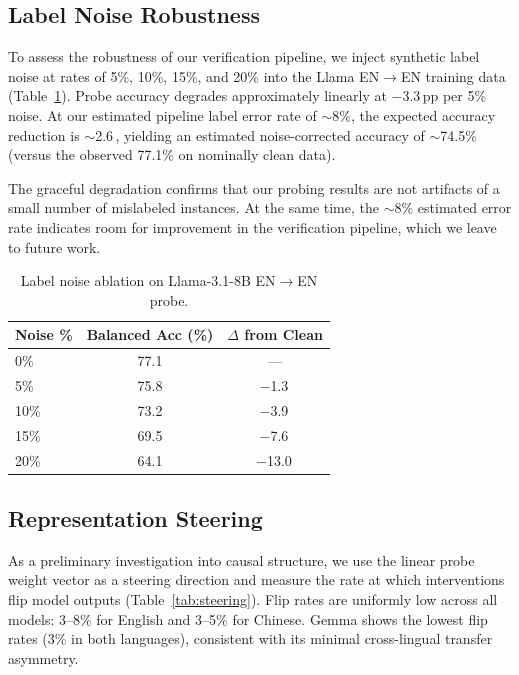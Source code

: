 \documentclass[11pt]{article}
\newcommand{\pp}{\,\text{pp}}
\begin{document}
\subsection{Label Noise Robustness}
\label{sec:noise}

To assess the robustness of our verification pipeline, we inject synthetic label noise at rates of 5\%, 10\%, 15\%, and 20\% into the Llama EN$\to$EN training data (Table~\ref{tab:noise}).
Probe accuracy degrades approximately linearly at $-3.3\pp$ per 5\% noise.
At our estimated pipeline label error rate of $\sim$8\%, the expected accuracy reduction is $\sim$2.6\pp, yielding an estimated noise-corrected accuracy of $\sim$74.5\% (versus the observed 77.1\% on nominally clean data).

The graceful degradation confirms that our probing results are not artifacts of a small number of mislabeled instances.
At the same time, the $\sim$8\% estimated error rate indicates room for improvement in the verification pipeline, which we leave to future work.

\begin{table}[t]
\centering
\caption{Label noise ablation on Llama-3.1-8B EN$\to$EN probe.}
\label{tab:noise}
\begin{tabular}{lcc}
\toprule
Noise \% & Balanced Acc (\%) & $\Delta$ from Clean \\
\midrule
0\%  & 77.1 & --- \\
5\%  & 75.8 & $-$1.3\pp \\
10\% & 73.2 & $-$3.9\pp \\
15\% & 69.5 & $-$7.6\pp \\
20\% & 64.1 & $-$13.0\pp \\
\bottomrule
\end{tabular}
\end{table}

\subsection{Representation Steering}
\label{sec:steering}

As a preliminary investigation into causal structure, we use the linear probe weight vector as a steering direction and measure the rate at which interventions flip model outputs (Table~\ref{tab:steering}).
Flip rates are uniformly low across all models: 3--8\% for English and 3--5\% for Chinese.
Gemma shows the lowest flip rates (3\% in both languages), consistent with its minimal cross-lingual transfer asymmetry.
\end{document}
